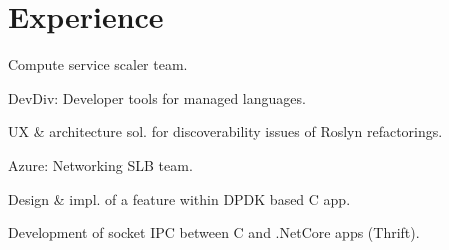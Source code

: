 \documentclass[a4paper]{deedy-resume} %
\begin{document}
\hfill
%
%
\begin{minipage}[t]{0.62\textwidth} %


\section{Experience}


\vspace{\topsep} %
\begin{tightitemize}
\item Compute service scaler team.
\end{tightitemize}

\sectionspace %



\begin{tightitemize}
\item DevDiv: Developer tools for managed languages.
\item UX \& architecture sol. for discoverability issues of Roslyn refactorings.
\end{tightitemize}

\begin{tightitemize}
\item Azure: Networking SLB team.
\item Design \& impl. of a feature within DPDK based C app.
\item Development of socket IPC between C and .NetCore apps (Thrift).
\end{tightitemize}

\sectionspace %



\end{minipage}
\end{document}
